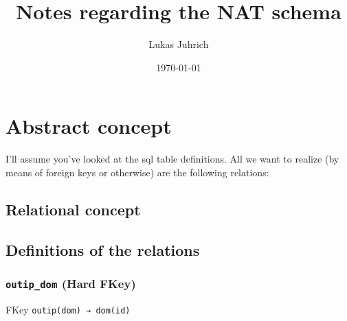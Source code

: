 \documentclass[11pt]{article}
\author{Lukas Juhrich}
\date{\today}
\title{Notes regarding the NAT schema}
\begin{document}
\maketitle
\tableofcontents


\section{Abstract concept}
\label{sec:orgd7af39b}

I'll assume you've looked at the sql table definitions.  All we want
to realize (by means of foreign keys or otherwise) are the following
relations:

\subsection{Relational concept}
\label{sec:org3450fef}


\subsection{Definitions of the relations}
\label{sec:org4397750}

\subsubsection{\texttt{outip\_dom} (Hard FKey)}
\label{sec:org713e022}
FKey \texttt{outip(dom) → dom(id)}
\end{document}
